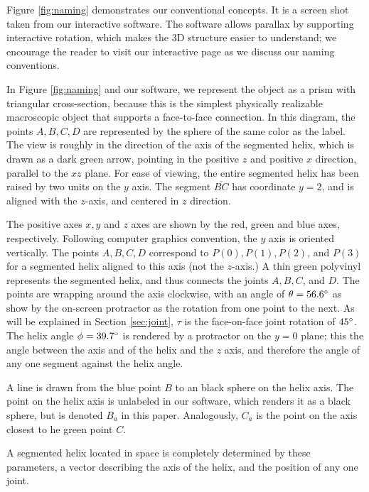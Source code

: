 \documentclass[11pt]{article}
\begin{document}
{Figure \ref{fig:naming} demonstrates our conventional concepts. It is a screen shot taken from our interactive software\cite{segmentedhelixinteractive}. The
software allows parallax by supporting interactive rotation, which makes the 3D structure easier to understand; we encourage
the reader to visit our interactive page as we discuss our naming conventions.

In Figure \ref{fig:naming} and our software, we represent the object as a prism with triangular cross-section, because this is
the simplest physically realizable macroscopic object that supports a face-to-face connection. In this diagram, the
points $A,B,C,D$ are represented by the sphere of the same color as the label. The view is roughly in the direction of
the axis of the segmented helix, which is drawn as a dark green arrow, pointing in the positive $z$ and positive $x$ direction,
parallel to the $xz$ plane. For ease of viewing, the entire segmented helix has been raised by two units on the $y$ axis.
The segment $\overline{BC}$ has coordinate $y = 2$, and is aligned with the $z$-axis, and centered in $z$ direction.

The positive axes $x,y$ and $z$ axes are shown by the red, green and blue axes, respectively.
Following computer graphics convention, the $y$ axis is oriented vertically.
The points $A,B,C,D$ correspond to $P(0), P(1), P(2)$, and $ P(3)$ for a segmented helix aligned
to this axis (not the $z$-axis.)
A thin green polyvinyl represents the segmented helix, and thus connects the joints $A,B,C$, and $D$.
The points are wrapping around the axis clockwise, with an angle of $\theta = 56.6 \degree$ as
show by the on-screen protractor as the rotation from one point to the next. As will be explained in Section \ref{sec:joint}, $\tau$
is the face-on-face joint rotation of $45 \degree$.
The helix angle $\phi = 39.7 \degree$ is rendered by a protractor on the $y = 0$ plane; this the angle between the axis
and of the helix and the $z$ axis, and therefore the angle of any one segment against the helix angle.

A line is drawn from the blue point $B$ to an black sphere on the helix axis. The point on the helix axis is unlabeled
in our software, which renders it as a black sphere, but is denoted $B_a$ in this paper. Analogously, $C_a$ is the point
on the axis closest to he green point $C$.


A segmented helix located in space is completely determined by these parameters, a vector describing the axis
of the helix, and the position of any one joint.

}
\end{document}
